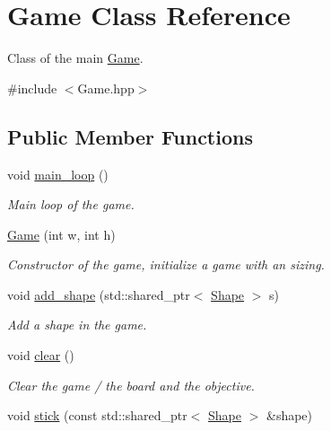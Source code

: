\hypertarget{classGame}{}\section{Game Class Reference}
\label{classGame}


Class of the main \hyperlink{classGame}{Game}.  




{\ttfamily \#include $<$Game.\+hpp$>$}

\subsection*{Public Member Functions}
\begin{DoxyCompactItemize}
\item 
\mbox{\label{classGame_a9e9a77d478f0c0bfb9b61fb1a6556e15}} 
void \hyperlink{classGame_a9e9a77d478f0c0bfb9b61fb1a6556e15}{main\+\_\+loop} ()
\begin{DoxyCompactList}\small\item\em Main loop of the game. \end{DoxyCompactList}\item 
\hyperlink{classGame_a2b0cb8af7b823a6d595eef9c9641f806}{Game} (int w, int h)
\begin{DoxyCompactList}\small\item\em Constructor of the game, initialize a game with an sizing. \end{DoxyCompactList}\item 
void \hyperlink{classGame_aab43fea0e202c203d998ae575d3f6eeb}{add\+\_\+shape} (std\+::shared\+\_\+ptr$<$ \hyperlink{classShape}{Shape} $>$ s)
\begin{DoxyCompactList}\small\item\em Add a shape in the game. \end{DoxyCompactList}\item 
\mbox{\label{classGame_a8ba8d7bcda356ed584dc445184320ff7}} 
void \hyperlink{classGame_a8ba8d7bcda356ed584dc445184320ff7}{clear} ()
\begin{DoxyCompactList}\small\item\em Clear the game / the board and the objective. \end{DoxyCompactList}\item 
void \hyperlink{classGame_a54ea3746d3738423197219af2d508188}{stick} (const std\+::shared\+\_\+ptr$<$ \hyperlink{classShape}{Shape} $>$ \&shape)

\end{DoxyCompactItemize}
